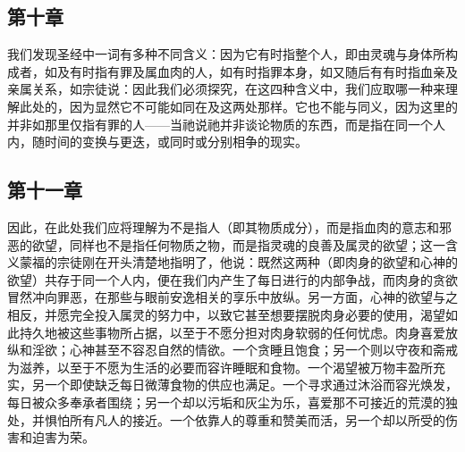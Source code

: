 
\subsection{第十章}

\par

我们发现圣经中一词有多种不同含义：因为它有时指整个人，即由灵魂与身体所构成者，如及有时指有罪及属血肉的人，如有时指罪本身，如又随后有有时指血亲及亲属关系，如宗徒说：因此我们必须探究，在这四种含义中，我们应取哪一种来理解此处的，因为显然它不可能如同在及这两处那样。它也不能与同义，因为这里的并非如那里仅指有罪的人——当祂说祂并非谈论物质的东西，而是指在同一个人内，随时间的变换与更迭，或同时或分别相争的现实。\par


\subsection{第十一章}

\par

因此，在此处我们应将理解为不是指人（即其物质成分），而是指血肉的意志和邪恶的欲望，同样也不是指任何物质之物，而是指灵魂的良善及属灵的欲望；这一含义蒙福的宗徒刚在开头清楚地指明了，他说：既然这两种（即肉身的欲望和心神的欲望）共存于同一个人内，便在我们内产生了每日进行的内部争战，而肉身的贪欲冒然冲向罪恶，在那些与眼前安逸相关的享乐中放纵。另一方面，心神的欲望与之相反，并愿完全投入属灵的努力中，以致它甚至想要摆脱肉身必要的使用，渴望如此持久地被这些事物所占据，以至于不愿分担对肉身软弱的任何忧虑。肉身喜爱放纵和淫欲；心神甚至不容忍自然的情欲。一个贪睡且饱食；另一个则以守夜和斋戒为滋养，以至于不愿为生活的必要而容许睡眠和食物。一个渴望被万物丰盈所充实，另一个即使缺乏每日微薄食物的供应也满足。一个寻求通过沐浴而容光焕发，每日被众多奉承者围绕；另一个却以污垢和灰尘为乐，喜爱那不可接近的荒漠的独处，并惧怕所有凡人的接近。一个依靠人的尊重和赞美而活，另一个却以所受的伤害和迫害为荣。\par

